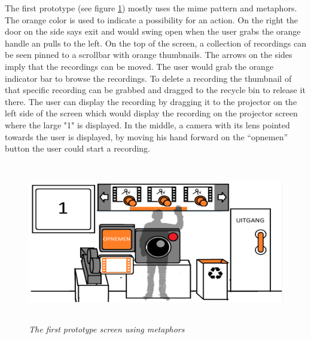 The first prototype (see figure \ref{first prototype}) mostly uses the mime pattern and metaphors. The orange color is used to indicate a possibility for an action. On the right the door on the side says exit and would swing open when the user grabs the orange handle an pulls to the left. On the top of the screen, a collection of recordings can be seen pinned to a scrollbar with orange thumbnails. The arrows on the sides imply that the recordings can be moved. The user would grab the orange indicator bar to browse the recordings. To delete a recording the thumbnail of that specific recording can be grabbed and dragged to the recycle bin to release it there. The user can display the recording by dragging it to the projector on the left side of the screen which would display the recording on the projector screen where the large "1" is displayed. In the middle, a camera with its lens pointed towards the user is displayed, by moving his hand forward on the ``opnemen'' button the user could start a recording.\\

\begin{figure}[H]
	\begin{center}
		\includegraphics[width=12.5cm, height=7cm]{figures/prototype_1_1_standard.png}
		\caption{\emph{The first prototype screen using metaphors}}
		\label{first prototype}
	\end{center}
\end{figure}

